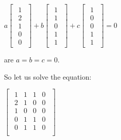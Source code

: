 \begin{math}
    a \begin{bmatrix}
        \begin{array}{c}
            1 \\
            2 \\
            1 \\
            0 \\
            0
        \end{array}
    \end{bmatrix}
    +b \begin{bmatrix}
        \begin{array}{c}
            1 \\
            1 \\
            0 \\
            1 \\
            1
        \end{array}
    \end{bmatrix}
    +c \begin{bmatrix}
        \begin{array}{c}
            1 \\
            0 \\
            0 \\
            1 \\
            1
        \end{array}
    \end{bmatrix}
    = 0
\end{math}

\singlespacing
\singlespacing

are $a = b = c = 0$.

\singlespacing

So let us solve the equation:

\singlespacing
\singlespacing

\begin{math}
    \begin{bmatrix}
        \begin{array}{ccc|c}
            1 & 1 & 1 & 0 \\
            2 & 1 & 0 & 0 \\
            1 & 0 & 0 & 0 \\
            0 & 1 & 1 & 0 \\
            0 & 1 & 1 & 0 \\
        \end{array}
    \end{bmatrix}
\end{math}

